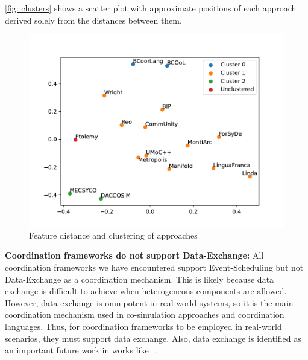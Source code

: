 \documentclass[runningheads]{llncs}
\begin{document}
\autoref{fig: clusters} shows a scatter plot with approximate positions of each approach derived solely from the distances between them.

\begin{figure}[ht]
	\centering
	\includegraphics[width=1\textwidth]{images/approach_scatter}
	\caption{Feature distance and clustering of approaches}
	\label{fig: clusters}
\end{figure}









\textbf{Coordination frameworks do not support Data-Exchange:} All coordination frameworks we have encountered support \textsf{Event-Scheduling} but not \textsf{Data-Exchange} as a coordination mechanism.
This is likely because data exchange is difficult to achieve when heterogeneous components are allowed.
However, data exchange is omnipotent in real-world systems, so it is the main coordination mechanism used in co-simulation approaches and coordination languages.
Thus, for coordination frameworks to be employed in real-world scenarios, they must support data exchange.
Also, data exchange is identified as an important future work in works like ~\cite{krauterBehavioralConsistencyMultimodeling2023,varalarsenBCOolBehavioralCoordination2016}.
\end{document}
